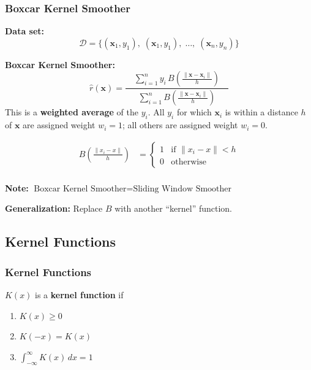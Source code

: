 \documentclass[xcolor={dvipsnames}]{beamer}
\renewcommand{\hat}{\widehat}
\newcommand{\cD}{\mathcal{D}}
\newcommand{\vx}{\mathbf{x}}
\begin{document}
\begin{frame}
    \frametitle{Boxcar Kernel Smoother}
    \setlength\parskip{0.75em}

    \textbf{Data set:}
    \[
        \cD = \{(\vx_1,y_1),\;(\vx_1,y_1),\;\ldots,\;(\vx_n, y_n)\}
    \]
    
    \textbf{Boxcar Kernel Smoother:}
    \[
    \hat r(\vx) = \frac{\displaystyle\quad\sum_{i=1}^n y_i\,B\left(\frac{\|\vx - \vx_i\|}h\right)\quad}    
    {\displaystyle\sum_{i=1}^n B\left(\frac{\|\vx - \vx_i\|}h\right)}
    \]
    This is a \textbf{weighted average} of the $y_i$. All $y_i$ for which $\vx_i$ is within a distance $h$ of $\vx$ are assigned weight $w_i=1$; all others are assigned weight $w_i=0$.

\end{frame}

\begin{frame}
\setlength\parskip{0.75em}
\begin{align*}
B\left(\frac{\|x_i - x\|}h\right) &= \begin{cases}
    1&\text{if $\|x_i-x\|<h$}\\
    0&\text{otherwise}
\end{cases}\\[1ex]
\end{align*}



\bigskip
\textbf{Note:} $\text{Boxcar Kernel Smoother} = \text{Sliding Window Smoother}$

\textbf{Generalization:} Replace $B$ with another ``kernel'' function.

\end{frame}

\subsection{Kernel Functions}
\begin{frame}
    \frametitle{Kernel Functions}
    \setlength\parskip{0.75em}

    $K(x)$ is a \textbf{kernel function} if
    \begin{enumerate}
        \setlength\parskip{0.75em}
        \item $K(x)\geq 0$
        \item $K(-x)=K(x)$
        \item $\displaystyle \int_{-\infty}^\infty K(x)\,dx = 1$
    \end{enumerate}
\end{frame}
\end{document}
